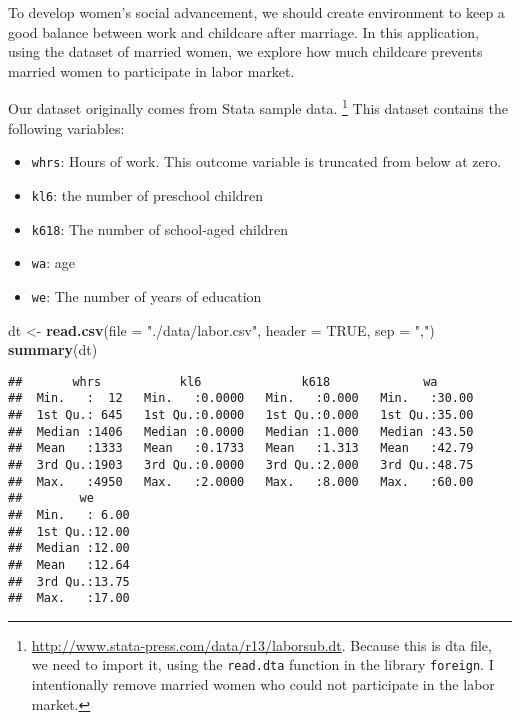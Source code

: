 \documentclass[
  12pt,
]{article}
\newenvironment{Shaded}{\begin{snugshade}}{\end{snugshade}}
\newcommand{\DataTypeTok}[1]{\textcolor[rgb]{0.13,0.29,0.53}{#1}}
\newcommand{\KeywordTok}[1]{\textcolor[rgb]{0.13,0.29,0.53}{\textbf{#1}}}
\newcommand{\NormalTok}[1]{#1}
\newcommand{\OtherTok}[1]{\textcolor[rgb]{0.56,0.35,0.01}{#1}}
\newcommand{\StringTok}[1]{\textcolor[rgb]{0.31,0.60,0.02}{#1}}
\providecommand{\tightlist}{%
  \setlength{\itemsep}{0pt}\setlength{\parskip}{0pt}}
\begin{document}
To develop women's social advancement, we should create environment to
keep a good balance between work and childcare after marriage. In this
application, using the dataset of married women, we explore how much
childcare prevents married women to participate in labor market.

Our dataset originally comes from Stata sample data. \footnote{\url{http://www.stata-press.com/data/r13/laborsub.dt}.
  Because this is dta file, we need to import it, using the
  \texttt{read.dta} function in the library \texttt{foreign}. I
  intentionally remove married women who could not participate in the
  labor market.} This dataset contains the following variables:

\begin{itemize}
\tightlist
\item
  \texttt{whrs}: Hours of work. This outcome variable is truncated from
  below at zero.
\item
  \texttt{kl6}: the number of preschool children
\item
  \texttt{k618}: The number of school‐aged children
\item
  \texttt{wa}: age
\item
  \texttt{we}: The number of years of education
\end{itemize}

\begin{Shaded}
\begin{Highlighting}[]
\NormalTok{dt \textless{}{-}}\StringTok{ }\KeywordTok{read.csv}\NormalTok{(}\DataTypeTok{file =} \StringTok{"./data/labor.csv"}\NormalTok{, }\DataTypeTok{header =} \OtherTok{TRUE}\NormalTok{,  }\DataTypeTok{sep =} \StringTok{","}\NormalTok{)}
\KeywordTok{summary}\NormalTok{(dt)}
\end{Highlighting}
\end{Shaded}

\begin{verbatim}
##       whrs           kl6              k618             wa       
##  Min.   :  12   Min.   :0.0000   Min.   :0.000   Min.   :30.00  
##  1st Qu.: 645   1st Qu.:0.0000   1st Qu.:0.000   1st Qu.:35.00  
##  Median :1406   Median :0.0000   Median :1.000   Median :43.50  
##  Mean   :1333   Mean   :0.1733   Mean   :1.313   Mean   :42.79  
##  3rd Qu.:1903   3rd Qu.:0.0000   3rd Qu.:2.000   3rd Qu.:48.75  
##  Max.   :4950   Max.   :2.0000   Max.   :8.000   Max.   :60.00  
##        we       
##  Min.   : 6.00  
##  1st Qu.:12.00  
##  Median :12.00  
##  Mean   :12.64  
##  3rd Qu.:13.75  
##  Max.   :17.00
\end{verbatim}
\end{document}
